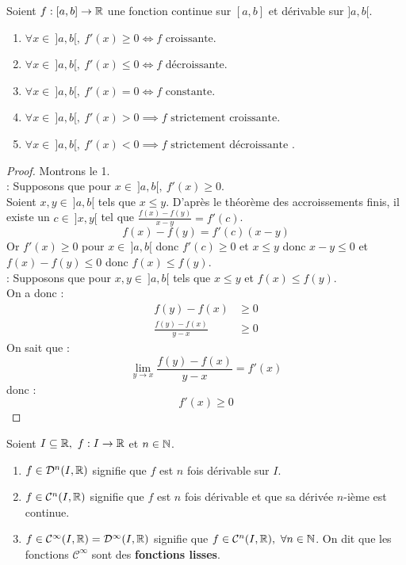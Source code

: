 \begin{proposition}
    Soient $f : [a, b] \to \mathbb{R}$ une fonction continue sur $[a, b]$ et dérivable sur $]a, b[$.
    \begin{enumerate}
            \item $\forall x \in \ ]a, b[,\ f'(x) \geq 0 \iff f \text{ croissante}$.
            \item $\forall x \in \ ]a, b[,\ f'(x) \leq 0 \iff f \text{ décroissante}$.
            \item $\forall x \in \ ]a, b[,\ f'(x) = 0 \iff f \text{ constante}$.
            \item $\forall x \in \ ]a, b[,\ f'(x) > 0 \implies f \text{ strictement croissante}$.
            \item $\forall x \in \ ]a, b[,\ f'(x) < 0 \implies f \text{ strictement décroissante}$ .
        \end{enumerate}
\end{proposition}

\begin{proof}
	Montrons le 1. 
	\\
	\boxed{\implies} : Supposons que pour $x \in \ ]a, b[,\ f'(x) \geq 0$. \\
	Soient $x, y \in \ ]a, b[$ tels que $x \leq y$. D'après le théorème des accroissements finis, il existe un $c \in \ ]x, y[$ tel que $\frac{f(x) - f(y)}{x - y} = f'(c)$.
	\[ f(x) - f(y) = f'(c)(x - y) \]
	Or $f'(x) \geq 0$ pour $x \in \ ]a, b[$ donc $f'(c) \geq 0$ et $x \leq y$ donc $x - y \leq 0$ et $f(x) - f(y) \leq 0$ donc  $f(x) \leq f(y)$.
	\\
	\boxed{\impliedby} : Supposons que pour $x, y \in \ ]a, b[$ tels que $x \leq y$ et $f(x) \leq f(y)$. \\
	On a donc :
	\begin{align*}
		f(y) - f(x) &\geq 0 \\
		\frac{f(y) - f(x)}{y - x} &\geq 0 
	\end{align*}
	On sait que :
	\[ \lim_{y \to x} \frac{f(y) - f(x)}{y - x} = f'(x) \]
	donc :
	\[ f'(x) \geq 0 \]
\end{proof}

\begin{definition}
	Soient $I \subseteq \mathbb{R},\ f : I \to \mathbb{R}$ et $n \in \mathbb{N}$.
	\begin{enumerate}
		\item $f \in \mathcal{D}^n(I, \mathbb{R})$ signifie que $f$ est $n$ fois dérivable sur $I$.
		\item $f \in \mathcal{C}^n(I, \mathbb{R})$ signifie que $f$ est $n$ fois dérivable et que sa dérivée $n$-ième est continue.
		\item $f \in \mathcal{C}^{\infty}(I, \mathbb{R}) = \mathcal{D}^{\infty}(I, \mathbb{R})$ signifie que $f \in \mathcal{C}^n(I, \mathbb{R}),\ \forall n \in \mathbb{N}$. On dit que les fonctions $\mathcal{C}^{\infty}$ sont des \textbf{fonctions lisses}.
	\end{enumerate}
\end{definition}

